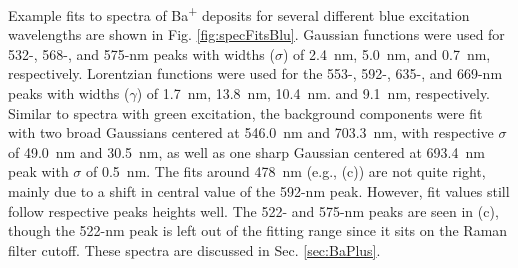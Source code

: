 Example fits to spectra of Ba\textsuperscript{+} deposits for several different blue excitation wavelengths are shown in Fig. \ref{fig:specFitsBlu}.  Gaussian functions were used for 532-, 568-, and 575-nm peaks with widths ($\sigma$) of 2.4~nm, 5.0~nm, and 0.7~nm, respectively.  Lorentzian functions were used for the 553-, 592-, 635-, and 669-nm peaks with widths ($\gamma$) of 1.7~nm, 13.8~nm, 10.4~nm. and 9.1~nm, respectively.  Similar to spectra with green excitation, the background components were fit with two broad Gaussians centered at 546.0~nm and 703.3~nm, with respective $\sigma$ of 49.0~nm and 30.5~nm, as well as one sharp Gaussian centered at 693.4~nm peak with $\sigma$ of 0.5~nm.  The fits around 478~nm (e.g., (c)) are not quite right, mainly due to a shift in central value of the 592-nm peak.  However, fit values still follow respective peaks heights well.  The 522- and 575-nm peaks are seen in (c), though the 522-nm peak is left out of the fitting range since it sits on the Raman filter cutoff.   These spectra are discussed in Sec. \ref{sec:BaPlus}.

